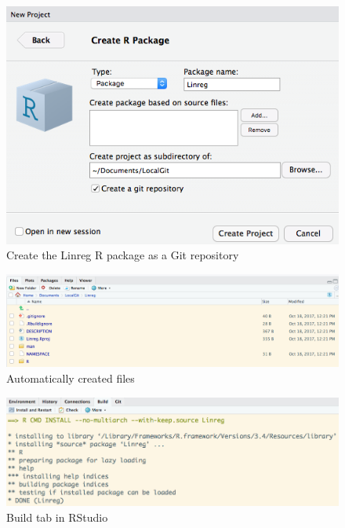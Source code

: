 \documentclass[]{book}
\theoremstyle{definition}
\theoremstyle{definition}
\theoremstyle{definition}
\theoremstyle{remark}
\begin{document}
\begin{figure}

{\centering \includegraphics[width=7.33in]{images/ch3_pkg_4_create} 

}

\caption{Create the Linreg R package as a Git repository}\label{fig:pkg4}
\end{figure}

\begin{figure}

{\centering \includegraphics[width=14.01in]{images/ch3_pkg_5_filelist} 

}

\caption{Automatically created files}\label{fig:pkg5}
\end{figure}

\begin{figure}

{\centering \includegraphics[width=12.6in]{images/ch3_pkg_6_install} 

}

\caption{Build tab in RStudio}\label{fig:pkg6}
\end{figure}
\end{document}
